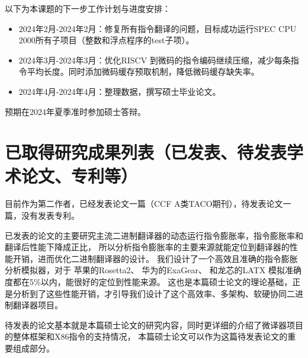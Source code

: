 \documentclass{Style/ucasproposal}%
\begin{document}
以下为本课题的下一步工作计划与进度安排：

\begin{itemize}
  \item 2024年2月-2024年2月：修复所有指令翻译的问题，目标成功运行SPEC CPU 2000所有子项目（整数和浮点程序的test子项）。
  \item 2024年3月-2024年3月：优化RISCV 到微码的指令编码继续压缩，减少每条指令平均长度。同时添加微码缓存预取机制，降低微码缓存缺失率。
  \item 2024年4月-2024年4月：整理数据，撰写硕士毕业论文。
\end{itemize}

预期在2024年夏季准时参加硕士答辩。


\section{已取得研究成果列表（已发表、待发表学术论文、专利等）}

目前作为第二作者，已经发表论文一篇（CCF A类TACO期刊），待发表论文一篇，没有发表专利。

已发表的论文的主要研究主流二进制翻译器的动态运行指令膨胀率，指令膨胀率和翻译后性能下降成正比，
所以分析指令膨胀率的主要来源就能定位到翻译器的性能开销，进而优化二进制翻译器的设计。
我们设计了一个高效且准确的指令膨胀分析模拟器，对于
苹果的Rosetta2\cite{RosettaTranslationEnvironment, RunningIntelBinaries}、
华为的ExaGear\cite{KunPengExaGear}、
和龙芯的LATX\cite{LoongArchEnv2022, LoongArch2023}
模拟准确度都在5\%以内，能很好的定位到性能来源。
这也是本篇硕士论文的理论基础，正是分析到了这些性能开销，才引导我们设计了这个高效率、多架构、软硬协同二进制翻译器项目。

待发表的论文基本就是本篇硕士论文的研究内容，同时更详细的介绍了微译器项目的整体框架和X86指令的支持情况，
本篇硕士论文可以作为这篇待发表论文的重要组成部分。





\end{document}
